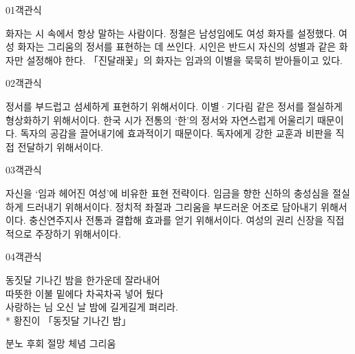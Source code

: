 \documentclass[fs9,seriesRus]{korfarm-base}
\begin{document}
\par\medskip
\kfBeginMC
\begin{kfQBlock}{01}{객관식}
\begin{kfChoices}
\kfChoice 화자는 시 속에서 항상 말하는 사람이다.
\kfChoice 정철은 남성임에도 여성 화자를 설정했다.
\kfChoice 여성 화자는 그리움의 정서를 표현하는 데 쓰인다.
\kfChoice 시인은 반드시 자신의 성별과 같은 화자만 설정해야 한다.
\kfChoice 「진달래꽃」의 화자는 임과의 이별을 묵묵히 받아들이고 있다.
\end{kfChoices}
\end{kfQBlock}
\begin{kfQBlock}{02}{객관식}
\begin{kfChoices}
\kfChoice 정서를 부드럽고 섬세하게 표현하기 위해서이다.
\kfChoice 이별·기다림 같은 정서를 절실하게 형상화하기 위해서이다.
\kfChoice 한국 시가 전통의 ‘한’의 정서와 자연스럽게 어울리기 때문이다.
\kfChoice 독자의 공감을 끌어내기에 효과적이기 때문이다.
\kfChoice 독자에게 강한 교훈과 비판을 직접 전달하기 위해서이다.
\end{kfChoices}
\end{kfQBlock}
\begin{kfQBlock}{03}{객관식}
\begin{kfChoices}
\kfChoice 자신을 ‘임과 헤어진 여성’에 비유한 표현 전략이다.
\kfChoice 임금을 향한 신하의 충성심을 절실하게 드러내기 위해서이다.
\kfChoice 정치적 좌절과 그리움을 부드러운 어조로 담아내기 위해서이다.
\kfChoice 충신연주지사 전통과 결합해 효과를 얻기 위해서이다.
\kfChoice 여성의 권리 신장을 직접적으로 주장하기 위해서이다.
\end{kfChoices}
\end{kfQBlock}
\begin{kfQBlock}{04}{객관식}
\begin{kfEvidence}동짓달 기나긴 밤을 한가운데 잘라내어   \\\relax
   따뜻한 이불 밑에다 차곡차곡 넣어 뒀다   \\\relax
   사랑하는 님 오신 날 밤에 길게길게 펴리라.   \\\relax
   * 황진이 「동짓달 기나긴 밤」\end{kfEvidence}
\begin{kfChoices}
\kfChoice 분노
\kfChoice 후회
\kfChoice 절망
\kfChoice 체념
\kfChoice 그리움
\end{kfChoices}
\end{kfQBlock}
\end{document}
